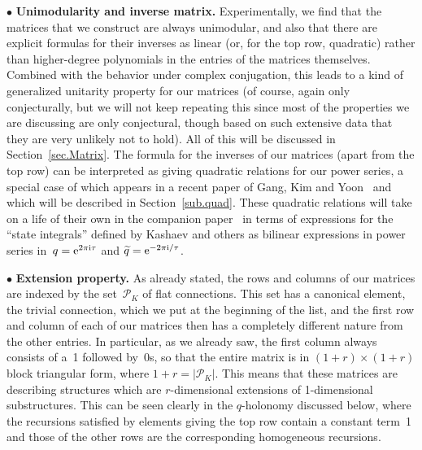 \documentclass[pdftex]{sigma}
\numberwithin{equation}{section}
\def\calP{\mathcal P}
\def\calP{\mathcal P}
\def\wt{\widetilde}
\begin{document}
$\bullet$ {\bf Unimodularity and inverse matrix.}
Experimentally, we find that the matrices that we construct are always unimodular, and also that there are explicit
formulas for their inverses as linear (or, for the top row, quadratic) rather than
higher-degree polynomials in the entries of the matrices themselves. Combined with the
behavior under complex conjugation, this leads to a kind of generalized unitarity
property for our matrices (of course, again only conjecturally, but we will not keep
repeating this since most of the properties we are discussing are only conjectural,
though based on such extensive data that they are very unlikely not to hold). All of
this will be discussed in Section~\ref{sec.Matrix}. The formula for the inverses of our
matrices (apart from the top row) can be interpreted as giving quadratic relations for
our power series, a special case of which appears in a recent paper of Gang, Kim and
Yoon~\cite{torsion} and which will be described in Section~\ref{sub.quad}.
These quadratic relations will take on a life of their own in the companion
paper~\cite{GZ:qseries} in terms of expressions for the ``state integrals'' defined by
Kashaev and others as bilinear expressions in power series in~$q={\rm e}^{2\pi{\rm i}\tau}$ and
$\wt q={\rm e}^{-2\pi{\rm i}/\tau}$.

$\bullet$ {\bf Extension property.}
As already stated, the rows and columns
of our matrices are indexed by the set~$\calP_K$ of flat connections. This set has a
canonical element, the trivial connection, which we put at the beginning of the list,
and the first row and column of each of our matrices then has a completely different
nature from the other entries. In particular, as we already saw, the first column
always consists of a~1 followed by~0s, so that the entire matrix is in
$(1+r)\times(1+r)$ block triangular form, where $1+r=|\calP_K|$. This means that
these matrices are describing structures which are $r$-dimensional extensions of
1-dimensional substructures. This can be seen clearly in the $q$-holonomy discussed
below, where the recursions satisfied by elements giving the top row contain a
constant term~1 and those of the other rows are the corresponding homogeneous recursions.
\end{document}
